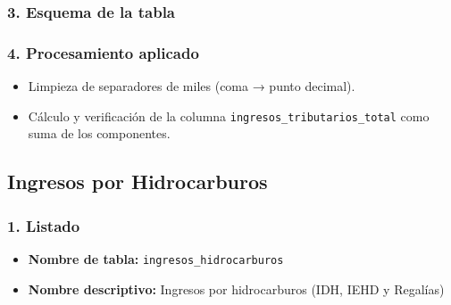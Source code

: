 \documentclass[12pt,a4paper]{article}
\begin{document}
\subsubsection*{3. Esquema de la tabla}

\subsubsection*{4. Procesamiento aplicado}
\begin{itemize}
  \item Limpieza de separadores de miles (coma → punto decimal).
  \item Cálculo y verificación de la columna \texttt{ingresos\_tributarios\_total} como suma de los componentes.
\end{itemize}
\subsection{Ingresos por Hidrocarburos}

\subsubsection*{1. Listado}
\begin{itemize}
  \item \textbf{Nombre de tabla:} \texttt{ingresos\_hidrocarburos}
  \item \textbf{Nombre descriptivo:} Ingresos por hidrocarburos (IDH, IEHD y Regalías)
\end{itemize}
\end{document}
